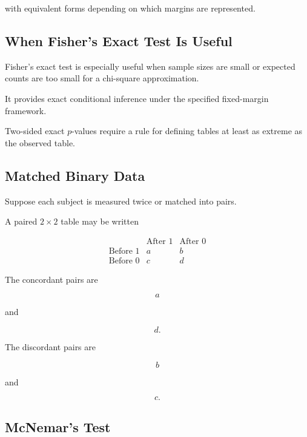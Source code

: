 with equivalent forms depending on which margins are represented.

\subsection{When Fisher's Exact Test Is Useful}
\label{subsec:when-fisher-exact}

Fisher's exact test is especially useful when sample sizes are small or
expected counts are too small for a chi-square approximation.

It provides exact conditional inference under the specified fixed-margin
framework.

Two-sided exact \(p\)-values require a rule for defining tables at least
as extreme as the observed table.

\subsection{Matched Binary Data}
\label{subsec:matched-binary-data}

Suppose each subject is measured twice or matched into pairs.

A paired \(2\times2\) table may be written

\[
\begin{array}{c|cc}
&
\text{After }1
&
\text{After }0
\\
\hline
\text{Before }1
&
a
&
b
\\
\text{Before }0
&
c
&
d
\end{array}
\]

The concordant pairs are

\[
a
\]

and

\[
d.
\]

The discordant pairs are

\[
b
\]

and

\[
c.
\]

\subsection{McNemar's Test}
\label{subsec:mcnemar-test}

